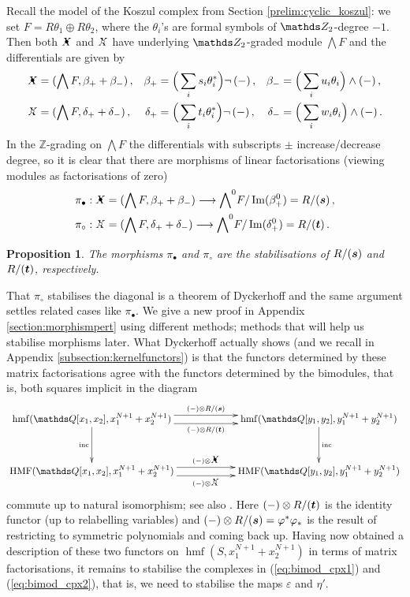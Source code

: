 \documentclass{compositio}
\newtheorem{proposition}[theorem]{Proposition}
\theoremstyle{definition}
\numberwithin{equation}{section}
\def\inc{\operatorname{inc}}
\def\Im{\operatorname{Im}}
\DeclareMathOperator{\hmf}{hmf}
\DeclareMathOperator{\HMF}{HMF}
\begin{document}
Recall the model of the Koszul complex from Section \ref{prelim:cyclic_koszul}: we set $F = R \theta_1 \oplus R \theta_2$, where the $\theta_i$'s are formal symbols of $\Ztwo$-degree $-1$. Then both $\Xbul$ and $\Xcirc$ have underlying $\Ztwo$-graded module $\bigwedge F$ and the differentials are given by
\begin{align*}
\Xbul & = ( \bigwedge F, \beta_+ + \beta_{-}) \, , & \beta_+ & = \Big(\sum_i s_i \theta_i^*\Big) \neg\, (-) \, , & \beta_{-} & = \Big(\sum_i u_i \theta_i\Big) \wedge (-) \, , \\
\Xcirc & = ( \bigwedge F, \delta_+ + \delta_{-}) \, , & \delta_+ & = \Big(\sum_i t_i \theta_i^*\Big) \neg\, (-) \, , & \delta_{-} & = \Big(\sum_i w_i \theta_i\Big) \wedge (-) \, .
\end{align*}
In the $\mathds{Z}$-grading on $\bigwedge F$ the differentials with subscripts $\pm$ increase/decrease degree, so it is clear that there are morphisms of linear factorisations (viewing modules as factorisations of zero)
\begin{align*}
& \pi_{\bullet}: \Xbul = ( \bigwedge F, \beta_+ + \beta_{-}) \lto {\bigwedge}^0 F/\Im(\beta_+^0) = R/(\boldsymbol{s}) \, ,\\
& \pi_{\circ}: \Xcirc = ( \bigwedge F, \delta_+ + \delta_{-}) \lto {\bigwedge}^0 F/\Im(\delta_+^0) = R/(\boldsymbol{t}) \, .
\end{align*}

\begin{proposition} The morphisms $\pi_{\bullet}$ and $\pi_{\circ}$ are the stabilisations of $R/(\boldsymbol{s})$ and $R/(\boldsymbol{t})$, respectively.
\end{proposition}

That $\pi_{\circ}$ stabilises the diagonal is a theorem of Dyckerhoff \cite{d0904.4713} and the same argument settles related cases like $\pi_{\bullet}$. We give a new proof in  Appendix \ref{section:morphismpert} using different methods; methods that will help us stabilise morphisms later. What Dyckerhoff actually shows (and we recall in Appendix \ref{subsection:kernelfunctors}) is that the functors determined by these matrix factorisations agree with the functors determined by the bimodules, that is, both squares implicit in the diagram 
\[
\xymatrix@C+3pc@R+1pc{
\hmf(\QQ[x_1,x_2], x_1^{N+1} + x_2^{N+1})\ar[d]_-{\inc}\ar@<1ex>[r]^-{(-) \otimes R/(\bs{s})}
\ar@<-1ex>[r]_-{(-) \otimes R/(\bs{t})}
& \hmf(\QQ[y_1,y_2], y_1^{N+1} + y_2^{N+1})\ar[d]^-{\inc}\\
\HMF(\QQ[x_1,x_2], x_1^{N+1} + x_2^{N+1})\ar@<1ex>[r]^-{(-) \otimes \Xbul}
\ar@<-1ex>[r]_-{(-) \otimes \Xcirc}
& \HMF(\QQ[y_1,y_2], y_1^{N+1} + y_2^{N+1})
}
\]
commute up to natural isomorphism; see also \cite{b1105.0702}. Here $(-) \otimes R/(\boldsymbol{t})$ is the identity functor (up to relabelling variables) and $(-) \otimes R/(\boldsymbol{s}) = \varphi^* \varphi_*$ is the result of restricting to symmetric polynomials and coming back up. Having now obtained a description of these two functors on $\hmf(S, x_1^{N+1} + x_2^{N+1})$ in terms of matrix factorisations, it remains to stabilise the complexes in (\ref{eq:bimod_cpx1}) and (\ref{eq:bimod_cpx2}), that is, we need to stabilise the maps $\varepsilon$ and $\eta'$. 
\end{document}

